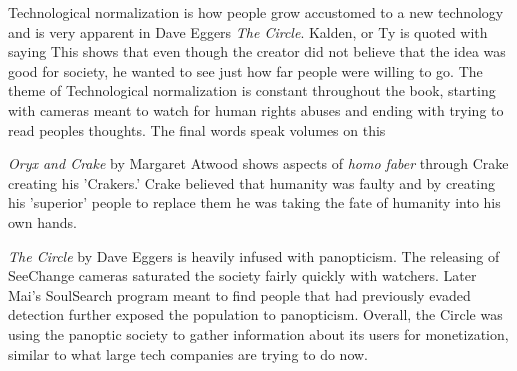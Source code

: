 Technological normalization is how people grow accustomed to a new technology and is very apparent in Dave Eggers \textit{The Circle}.
Kalden, or Ty is quoted with saying  \autocite[262]{eggers1}
This shows that even though the creator did not believe that the idea was good for society, he wanted to see just how far people were willing to go.
The theme of Technological normalization is constant throughout the book, starting with cameras meant to watch for human rights abuses and ending with trying to read peoples thoughts.
The final words speak volumes on this  \autocite[268]{eggers1}

\textit{Oryx and Crake} by Margaret Atwood shows aspects of \textit{homo faber} through Crake creating his 'Crakers.'
Crake believed that humanity was faulty and by creating his 'superior' people to replace them he was taking the fate of humanity into his own hands.

\textit{The Circle} by Dave Eggers is heavily infused with panopticism.
The releasing of SeeChange cameras saturated the society fairly quickly with watchers.
Later Mai's SoulSearch program meant to find people that had previously evaded detection further exposed the population to panopticism.
Overall, the Circle was using the panoptic society to gather information about its users for monetization, similar to what large tech companies are trying to do now.